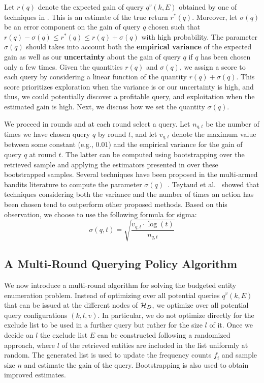 Let $r(q)$ denote the expected gain of query $q^v(k,E)$ obtained by one of techniques in . This is an estimate of the true return $r^*(q)$. Moreover, let $\sigma(q)$ be an error component on the gain of query $q$ chosen such that $r(q) - \sigma(q) \leq r^*(q) \leq r(q) + \sigma(q)$ with high probability. The parameter $\sigma(q)$ should takes into account both the {\bf empirical variance} of the expected gain as well as our {\bf uncertainty} about the gain of query $q$ if $q$ has been chosen only a few times. Given the quantities $r(q)$ and $\sigma(q)$, we assign a score to each query by considering a linear function of the quantity $r(q) + \sigma(q)$. This score prioritizes exploration when the variance is or our uncertainty is high, and thus, we could potentially discover a profitable query, and exploitation when the estimated gain is high. Next, we discuss how we set the quantity $\sigma(q)$.

We proceed in rounds and at each round select a query. Let $n_{q,t}$ be the number of times we have chosen query $q$ by round $t$, and let $v_{q,t}$ denote the maximum value between some constant (e.g., $0.01$) and the empirical variance for the gain of query $q$ at round $t$. The latter can be computed using bootstrapping over the retrieved sample and applying the estimators presented in  over these bootstrapped samples. Several techniques have been proposed in the multi-armed bandits literature to compute the parameter $\sigma(q)$~\cite{teytaud:inria-00173263}. Teytaud et al.~\cite{teytaud:inria-00173263} showed that techniques considering both the variance and the number of times an action has been chosen tend to outperform other proposed methods. Based on this observation, we choose to use the following formula for sigma:
\begin{equation}
\label{eq:upper}
\sigma(q,t) = \sqrt{\frac{v_{q,t}\cdot\log(t)}{n_{q,t}}}
\end{equation}

\subsection{A Multi-Round Querying Policy Algorithm}
\label{sec:heuristic}
We now introduce a multi-round algorithm for solving the budgeted entity enumeration problem. Instead of optimizing over all potential queries $q^v(k,E)$ that can be issued at the different nodes of $\mathcal{H}_D$, we optimize over all potential query configurations $(k,l,v)$. In particular, we do not optimize directly for the exclude list to be used in a further query but rather for the size $l$ of it. Once we decide on $l$ the exclude list $E$ can be constructed following a randomized approach, where $l$ of the retrieved entities are included in the list uniformly at random. The generated list is used to update the frequency counts $f_i$ and sample size $n$ and estimate the gain of the query. Bootstrapping is also used to obtain improved estimates. 

